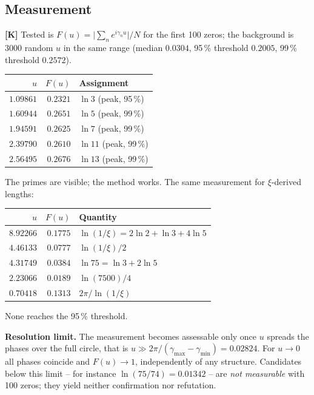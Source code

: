 \subsection{Measurement}

\textbf{[K]} Tested is $F(u) = \bigl|\sum_n e^{i\gamma_n u}\bigr|/N$ for
the first 100 zeros; the background is 3000 random $u$ in the same range
(median $0.0304$, 95\,\% threshold $0.2005$, 99\,\% threshold
$0.2572$).

\begin{center}
\begin{tabular}{rrl}
\toprule
$u$ & $F(u)$ & Assignment \\
\midrule
$1.09861$ & $0.2321$ & $\ln 3$ \quad(peak, 95\,\%) \\
$1.60944$ & $0.2651$ & $\ln 5$ \quad(peak, 99\,\%) \\
$1.94591$ & $0.2625$ & $\ln 7$ \quad(peak, 99\,\%) \\
$2.39790$ & $0.2610$ & $\ln 11$ \quad(peak, 99\,\%) \\
$2.56495$ & $0.2676$ & $\ln 13$ \quad(peak, 99\,\%) \\
\bottomrule
\end{tabular}
\end{center}

The primes are visible; the method works. The same measurement for
$\xi$-derived lengths:

\begin{center}
\begin{tabular}{rrl}
\toprule
$u$ & $F(u)$ & Quantity \\
\midrule
$8.92266$ & $0.1775$ & $\ln(1/\xi) = 2\ln2+\ln3+4\ln5$ \\
$4.46133$ & $0.0777$ & $\ln(1/\xi)/2$ \\
$4.31749$ & $0.0384$ & $\ln 75 = \ln3+2\ln5$ \\
$2.23066$ & $0.0189$ & $\ln(7500)/4$ \\
$0.70418$ & $0.1313$ & $2\pi/\ln(1/\xi)$ \\
\bottomrule
\end{tabular}
\end{center}

None reaches the 95\,\% threshold.

\textbf{Resolution limit.} The measurement becomes assessable only once
$u$ spreads the phases over the full circle, that is
$u \gg 2\pi/(\gamma_{\max}-\gamma_{\min}) = 0.02824$. For $u\to 0$ all
phases coincide and $F(u)\to 1$, independently of any structure.
Candidates below this limit -- for instance $\ln(75/74) = 0.01342$ --
are \emph{not measurable} with 100 zeros; they yield neither
confirmation nor refutation.

